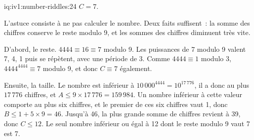 \begin{solution}{iq:iv1:number-riddles:24}
$C = 7$.

L'astuce consiste à ne pas calculer le nombre. Deux faits suffisent~: la somme des chiffres conserve le reste modulo 9, et les sommes des chiffres diminuent très vite.

D'abord, le reste. $4444 \equiv 16 \equiv 7$ modulo 9. Les puissances de 7 modulo 9 valent 7, 4, 1 puis se répètent, avec une période de 3. Comme $4444 \equiv 1$ modulo 3, $4444^{4444} \equiv 7$ modulo 9, et donc $C \equiv 7$ également.

Ensuite, la taille. Le nombre est inférieur à $10\,000^{4444} = 10^{17\,776}$, il a donc au plus $17\,776$ chiffres, et $A \le 9 \times 17\,776 = 159\,984$. Un nombre inférieur à cette valeur comporte au plus six chiffres, et le premier de ces six chiffres vaut 1, donc $B \le 1 + 5 \times 9 = 46$. Jusqu'à 46, la plus grande somme de chiffres revient à 39, donc $C \le 12$. Le seul nombre inférieur ou égal à 12 dont le reste modulo 9 vaut 7 est 7.

\end{solution}

